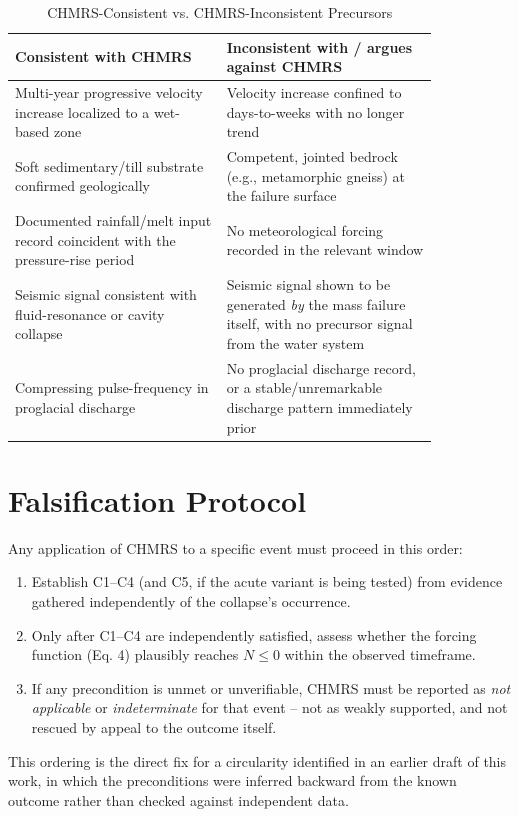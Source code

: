 \documentclass[11pt,twocolumn]{article}
\begin{document}
\begin{table}[h]
\centering
\caption{CHMRS-Consistent vs. CHMRS-Inconsistent Precursors}
\small
\begin{tabular}{p{0.42\linewidth}p{0.42\linewidth}}
\toprule
\textbf{Consistent with CHMRS} & \textbf{Inconsistent with / argues against CHMRS} \\
\midrule
Multi-year progressive velocity increase localized to a wet-based zone & Velocity increase confined to days-to-weeks with no longer trend \\
Soft sedimentary/till substrate confirmed geologically & Competent, jointed bedrock (e.g., metamorphic gneiss) at the failure surface \\
Documented rainfall/melt input record coincident with the pressure-rise period & No meteorological forcing recorded in the relevant window \\
Seismic signal consistent with fluid-resonance or cavity collapse & Seismic signal shown to be generated \emph{by} the mass failure itself, with no precursor signal from the water system \\
Compressing pulse-frequency in proglacial discharge & No proglacial discharge record, or a stable/unremarkable discharge pattern immediately prior \\
\bottomrule
\end{tabular}
\end{table}

\section{Falsification Protocol}
Any application of CHMRS to a specific event must proceed in this order:
\begin{enumerate}
\item Establish C1--C4 (and C5, if the acute variant is being tested) from evidence gathered independently of the collapse's occurrence.
\item Only after C1--C4 are independently satisfied, assess whether the forcing function (Eq. 4) plausibly reaches $N \le 0$ within the observed timeframe.
\item If any precondition is unmet or unverifiable, CHMRS must be reported as \emph{not applicable} or \emph{indeterminate} for that event -- not as weakly supported, and not rescued by appeal to the outcome itself.
\end{enumerate}
This ordering is the direct fix for a circularity identified in an earlier draft of this work, in which the preconditions were inferred backward from the known outcome rather than checked against independent data.
\end{document}
